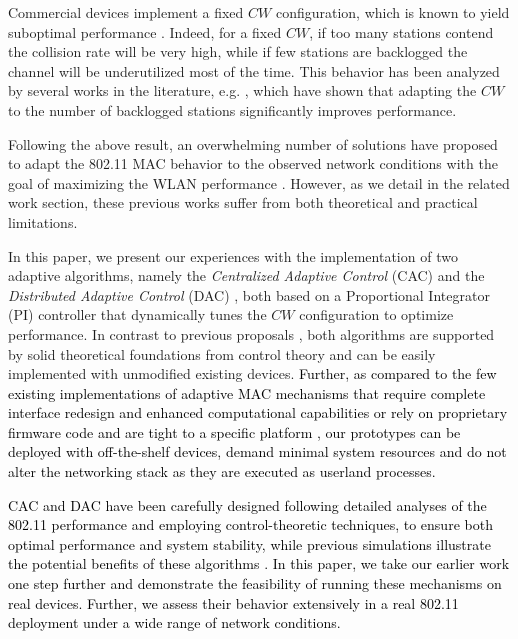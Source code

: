\documentclass[a4paper,10pt]{article}
\newcommand{\revs}[1]{\textcolor{black}{#1}}
\begin{document}
Commercial devices implement a fixed $CW$ configuration, which is known to yield suboptimal performance \revs{\cite{bianchi00}}. Indeed, for a fixed $CW$, if too many stations contend the collision rate will be very high, while if few stations are backlogged the channel will be underutilized most of the time. This behavior has been analyzed by several works in the literature, e.g. \revs{\cite{bianchi00,comnet,tvt}}, which have shown that adapting the $CW$ to the number of backlogged stations significantly improves performance.

Following the above result, an overwhelming number of solutions have proposed to adapt the 802.11 MAC behavior to the observed network conditions with the goal of maximizing the WLAN performance \cite{freitag06,scalia06,nafaa05,yang07,xia06,ni03,slow05,slow10,heusse05,siris06, AOBimpl}. 
However, as we detail in the related work section, these previous works suffer from both theoretical and practical limitations.


In this paper, we present our experiences with the implementation of two adaptive algorithms, namely the \emph{Centralized Adaptive Control} (CAC) \cite{patras09monet} and the \emph{Distributed Adaptive Control} (DAC) \cite{patras10tmc}, both based on a Proportional Integrator (PI) controller that dynamically tunes the $CW$ configuration to optimize performance. In contrast to previous proposals \revs{\cite{freitag06,scalia06,nafaa05,yang07,xia06,ni03,slow05,slow10,heusse05,idle07, siris06, AOBimpl}}, both algorithms are supported by solid theoretical foundations from control theory and can be easily implemented with unmodified existing devices. \revs{Further, as compared to the few existing implementations of adaptive MAC mechanisms that require complete interface redesign and enhanced computational capabilities \cite{AOBimpl} or rely on proprietary firmware code and are tight to a specific platform \cite{idle07}, our prototypes can be deployed with off-the-shelf devices, demand minimal system resources and do not alter the networking stack as they are executed as userland processes.}

\revs{CAC and DAC have been carefully designed following detailed analyses of the 802.11 performance and employing control-theoretic techniques, to ensure both optimal performance and system stability, while previous simulations illustrate the potential benefits of these algorithms \cite{patras09monet,patras10tmc}. In this paper, we take our earlier work one step further and demonstrate the feasibility of running these mechanisms on real devices. Further, we assess their behavior extensively in a real 802.11 deployment under a wide range of network conditions.}
\end{document}
